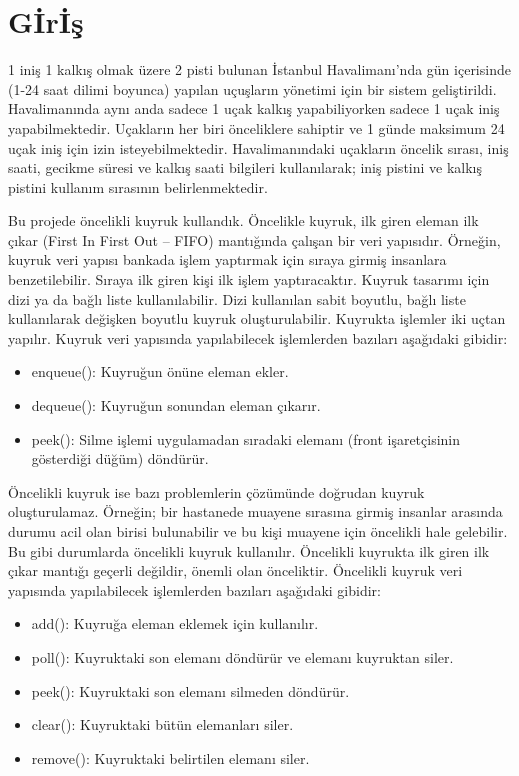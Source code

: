 \documentclass[conference]{IEEEtran}
\begin{document}
\section*{\textbf{\LARGE Gİrİş}}
\Large{
1 iniş 1 kalkış olmak üzere 2 pisti bulunan İstanbul Havalimanı’nda gün içerisinde (1-24 saat dilimi boyunca) yapılan uçuşların yönetimi için bir sistem geliştirildi. Havalimanında aynı anda sadece 1 uçak kalkış yapabiliyorken sadece 1 uçak iniş yapabilmektedir. Uçakların her biri önceliklere sahiptir ve 1 günde maksimum 24 uçak iniş için izin isteyebilmektedir. Havalimanındaki uçakların öncelik sırası, iniş saati, gecikme süresi ve kalkış saati bilgileri kullanılarak; iniş pistini ve kalkış pistini kullanım sırasının belirlenmektedir.

Bu projede öncelikli kuyruk kullandık. Öncelikle kuyruk, ilk giren eleman ilk çıkar (First In First Out – FIFO) mantığında çalışan bir veri yapısıdır. Örneğin, kuyruk veri yapısı bankada işlem yaptırmak için sıraya girmiş insanlara benzetilebilir. Sıraya ilk giren kişi ilk işlem yaptıracaktır. Kuyruk tasarımı için dizi ya da bağlı liste kullanılabilir. Dizi kullanılan sabit boyutlu, bağlı liste kullanılarak değişken boyutlu kuyruk oluşturulabilir. Kuyrukta işlemler iki uçtan yapılır. Kuyruk veri yapısında yapılabilecek işlemlerden bazıları aşağıdaki gibidir:

\begin{itemize}

\item enqueue(): Kuyruğun önüne eleman ekler.
\item dequeue(): Kuyruğun sonundan eleman çıkarır.
\item peek(): Silme işlemi uygulamadan sıradaki elemanı (front işaretçisinin gösterdiği düğüm) döndürür.

\end{itemize}

Öncelikli kuyruk ise bazı problemlerin çözümünde doğrudan kuyruk oluşturulamaz. Örneğin; bir hastanede muayene sırasına girmiş insanlar arasında durumu acil olan birisi bulunabilir ve bu kişi muayene için öncelikli hale gelebilir. Bu gibi durumlarda öncelikli kuyruk kullanılır. Öncelikli kuyrukta ilk giren ilk çıkar mantığı geçerli değildir, önemli olan önceliktir. Öncelikli kuyruk veri yapısında yapılabilecek işlemlerden bazıları aşağıdaki gibidir:

\begin{itemize}

\item add(): Kuyruğa eleman eklemek için kullanılır.
\item poll(): Kuyruktaki son elemanı döndürür ve elemanı kuyruktan siler.
\item peek(): Kuyruktaki son elemanı silmeden döndürür.
\item clear(): Kuyruktaki bütün elemanları siler.
\item remove(): Kuyruktaki belirtilen elemanı siler.


\end{itemize}}
\end{document}
